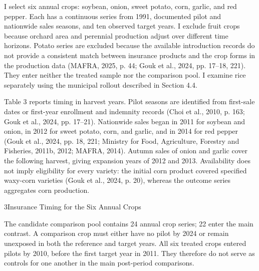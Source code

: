 I select six annual crops: soybean, onion, sweet potato, corn, garlic, and red pepper. Each has a continuous series from 1991, documented pilot and nationwide sales seasons, and ten observed target years. I exclude fruit crops because orchard area and perennial production adjust over different time horizons. Potato series are excluded because the available introduction records do not provide a consistent match between insurance products and the crop forms in the production data (MAFRA, 2025, p. 44; Gouk et al., 2024, pp. 17--18, 221). They enter neither the treated sample nor the comparison pool. I examine rice separately using the municipal rollout described in Section 4.4.

Table 3 reports timing in harvest years. Pilot seasons are identified from first-sale dates or first-year enrollment and indemnity records (Choi et al., 2010, p. 163; Gouk et al., 2024, pp. 17--21). Nationwide sales began in 2011 for soybean and onion, in 2012 for sweet potato, corn, and garlic, and in 2014 for red pepper (Gouk et al., 2024, pp. 18, 221; Ministry for Food, Agriculture, Forestry and Fisheries, 2011b, 2012; MAFRA, 2014). Autumn sales of onion and garlic cover the following harvest, giving expansion years of 2012 and 2013. Availability does not imply eligibility for every variety: the initial corn product covered specified waxy-corn varieties (Gouk et al., 2024, p. 20), whereas the outcome series aggregates corn production.

\begin{wordtable}{3}{Insurance Timing for the Six Annual Crops}

\end{wordtable}

The candidate comparison pool contains 24 annual crop series; 22 enter the main contrast. A comparison crop must either have no pilot by 2024 or remain unexposed in both the reference and target years. All six treated crops entered pilots by 2010, before the first target year in 2011. They therefore do not serve as controls for one another in the main post-period comparisons.

